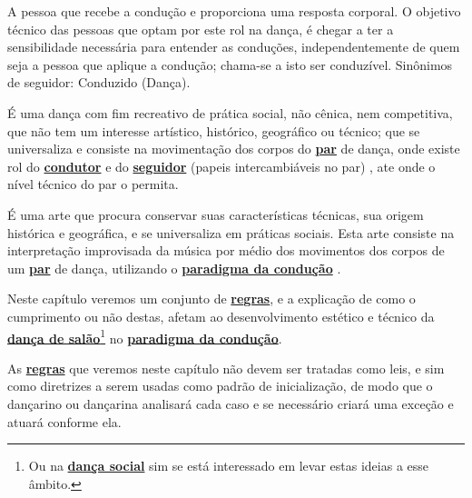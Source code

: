 \begin{definition} 
\label{def:Seguidor} 
A pessoa que recebe a condução e proporciona uma resposta corporal. 
O objetivo técnico das pessoas que optam por este rol na dança, é chegar 
a ter a sensibilidade necessária para entender as conduções,
independentemente de quem seja a pessoa que aplique a condução;
chama-se a isto ser conduzível.
Sinônimos de seguidor: Conduzido (Dança).
\end{definition}

\begin{definition}
\label{def:DancaSocial} 
É uma dança com fim recreativo de prática social, não cênica, nem competitiva, 
que não tem um interesse artístico, histórico, geográfico ou técnico; 
que se universaliza e consiste na movimentação dos corpos do \hyperref[def:Par]{\textbf{par}} de dança, 
onde existe rol do \hyperref[def:Condutor]{\textbf{condutor}} e do \hyperref[def:Seguidor]{\textbf{seguidor}} (papeis intercambiáveis no par) \cite{Zamoner2012}, ate onde o nível técnico do par o permita.
\end{definition}

\begin{definition}
\label{def:DancaSalao}  
É uma arte que procura conservar suas características técnicas, 
sua origem histórica e geográfica, e se universaliza em práticas sociais. 
Esta arte consiste na interpretação improvisada da música por médio dos movimentos 
dos corpos de um \hyperref[def:Par]{\textbf{par}} de dança, 
utilizando o \hyperref[def:ParadigmaConducao]{\textbf{paradigma da condução}} \cite{Zamoner2012}.
\end{definition}

Neste capítulo veremos um conjunto de \hyperref[def:Regra]{\textbf{regras}}, 
e a explicação de como o cumprimento ou não destas, 
afetam ao desenvolvimento estético e técnico da \hyperref[def:DancaSalao]{\textbf{dança de 
salão}}\footnote{Ou na \hyperref[def:DancaSocial]{\textbf{dança social}} sim se está interessado em levar estas ideias a esse âmbito.}  no \hyperref[def:ParadigmaConducao]{\textbf{paradigma da condução}}.

As \hyperref[def:Regra]{\textbf{regras}} que veremos neste capítulo não devem ser
tratadas como leis, e sim como diretrizes a serem usadas como padrão de inicialização, de modo que 
o dançarino ou dançarina analisará cada caso e se necessário criará uma exceção e atuará conforme ela.

